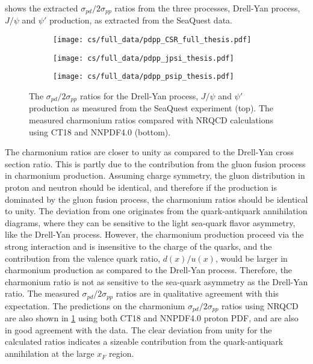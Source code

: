 \documentclass[../main.tex]{subfiles}
\begin{document}
 shows the extracted $\sigma_{pd}/2\sigma_{pp}$ ratios from the three processes,
Drell-Yan process, $J/\psi$ and $\psi'$ production, as extracted from the SeaQuest data.
\begin{figure}[h!]
	\centering
	\begin{subfigure}{0.8\linewidth}
		\texttt{[image: cs/full\_data/pdpp\_CSR\_full\_thesis.pdf]}
	\end{subfigure}
	\begin{subfigure}{0.48\linewidth}
		\texttt{[image: cs/full\_data/pdpp\_jpsi\_thesis.pdf]}
	\end{subfigure}
	\begin{subfigure}{0.48\linewidth}
		\texttt{[image: cs/full\_data/pdpp\_psip\_thesis.pdf]}
	\end{subfigure}
	\caption{The $\sigma_{pd}/2\sigma_{pp}$ ratios for the Drell-Yan process, $J/\psi$ and $\psi'$ production
		as measured from the SeaQuest experiment (top).
		The measured charmonium ratios compared with NRQCD calculations using CT18 and NNPDF4.0 (bottom).
	}
	\label{fig:csr_all_process}
\end{figure}
The charmonium ratios are closer to unity as compared to the Drell-Yan cross section ratio. This
is partly due to the contribution from the gluon fusion process in charmonium production. Assuming
charge symmetry, the gluon distribution in proton and neutron should be identical, and therefore
if the production is dominated by the gluon fusion process, the charmonium ratios should be identical
to unity. The deviation from one originates from the quark-antiquark annihilation diagrams, where they
can be sensitive to the light sea-quark flavor asymmetry, like the Drell-Yan process. However, the charmonium
production proceed via the strong interaction and is insensitive to the charge of the quarks, and
the contribution from the valence quark ratio, $d(x)/u(x)$, would be larger in charmonium production as compared to the Drell-Yan process.
Therefore, the charmonium ratio is not as sensitive to the sea-quark asymmetry as the Drell-Yan ratio.
The measured $\sigma_{pd}/2\sigma_{pp}$ ratios are in qualitative agreement with this expectation.
The predictions on the charmonium $\sigma_{pd}/2\sigma_{pp}$ ratios using NRQCD are also shown in
\cref{fig:csr_all_process} using both CT18 and NNPDF4.0 proton PDF, and are also in good agreement
with the data. The clear deviation from unity for the calculated ratios indicates a sizeable
contribution from the quark-antiquark annihilation at the large $x_F$ region.
\FloatBarrier
\end{document}

